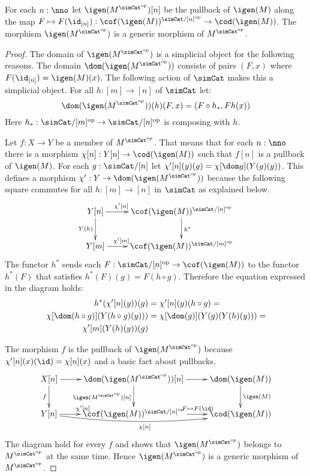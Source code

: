 \documentclass{tac}
\newcommand\hide[1]{}
\newcommand\cat\mathcal
\newcommand\ri{^*}
\newcommand\dual{^{\mathrm{op}}}
\newcommand\s{^{\simCat\dual}}
\newcommand\of{:}
\newcommand\di{_*}
\begin{document}
\hide{ does this still make sense? }
\begin{lemma}
For each $n\of\nno$ let $\igen(M\s)[n]$ be the pullback of $\igen(M)$ along the map $F\mapsto F(\id_{[n]})\of\cof(\igen(M))^{\simCat/[n]\dual}\to \cod(\igen(M))$. The morphism $\igen(M\s)$ is a generic morphism of $M\s$.
\end{lemma}


\begin{proof} %
The domain of $\igen(M\s)$ is a simplicial object for the following reasons. The domain $\dom(\igen(M\s))$ consists of pairs $(F,x)$ where $F(\id_{[n]}) = \igen(M)(x)$. The following action of $\simCat$ makes this a simplicial object. For all $h\of[m]\to[n]$ of $\simCat$ let:
\[\dom(\igen(M\s))(h)(F,x) = (F\circ h\di, Fh(x))\] Here $h\di\of\simCat/[m]\dual\to\simCat/[n]\dual$ is composing with $h$.

Let $f\of X\to Y$ be a member of $M\s$. That means that for each $n\of\nno$ there is a morphism $\chi[n]\of Y[n] \to \cod(\igen(M))$ such that $f[n]$ is a pullback of $\igen(M)$. For each $g\of \simCat/[n]$ let $\chi'[n](y)(g) = \chi[\dom g](Y(g)(y))$. This defines a morphism $\chi'\of Y\to \dom (\igen(M\s))$ because the following square commutes for all $h\of [m]\to [n]$ in $\simCat$ as explained below.
\[\xymatrix{
Y[n]\ar[d]_{Y(h)} \ar[r]^(.3){\chi'[n]} & \cof(\igen(M))^{\simCat/[n]\dual} \ar[d]^{h\ri}\\
Y[m] \ar[r]^(.3){\chi'[m]} & \cof(\igen(M))^{\simCat/[m]\dual}
}\]
The functor $h\ri$ sends each $F\of\simCat/[n]\dual\to \cof(\igen(M))$ to the functor $h\ri(F)$ that satisfies $h\ri(F)(g) = F(h\circ g)$. Therefore the equation expressed in the diagram holds:
\begin{align*}
h\ri(\chi'[n](y))(g) &= \chi'[n](y)(h\circ g) = \\
\chi[\dom (h\circ g)](Y(h\circ g)(y))) &= \chi[\dom (g)](Y(g)(Y(h)(y))) =\\
\chi'[m](Y(h)(y))(g)
\end{align*}

The morphism $f$ is the pullback of $\igen(M\s)$ because $\chi'[n](x)(\id) = \chi[n](x)$ and a basic fact about pullbacks.
\[\xymatrix{
X[n]\ar[d]_f\ar[r] & \dom(\igen(M\s))[n] \ar[r]\ar[d]_{\igen(M\s)[n]} & \dom(\igen(M))\ar[d]^{\igen(M)} \\
Y[n] \ar[r]^(.4){\chi'[n]} \ar@/_2ex/[rr]_{\chi[n]} & \cof(\igen(M))^{\simCat/[n]\dual} \ar[r]^(.6){F\mapsto F(\id)} & \cod(\igen(M))
}\]
The diagram hold for every $f$ and shows that $\igen(M\s)$ belongs to $M\s$ at the same time. Hence $\igen(M\s)$ is a generic morphism of $M\s$.
\end{proof}\hide{ Even if we cannot build $\cof(\igen(M))\s$ in $\cat S$, that does mean the pullback is not a modest morphism. }
\end{document}
